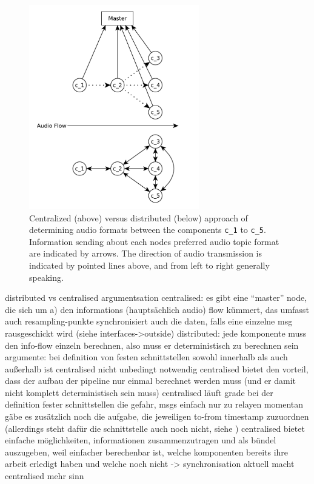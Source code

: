 \begin{figure}[]
	\centering
	\includegraphics[width=0.66\textwidth]{diagrams/lib_central_vs_dist.pdf}
	\caption{Centralized (above) versus distributed (below) approach of determining audio formats between the components \texttt{c\_1} to \texttt{c\_5}.
		Information sending about each nodes preferred audio topic format are indicated by arrows.
		The direction of audio transmission is indicated by pointed lines above, and from left to right generally speaking.}
	\label{pic:main:lib:central_vs_dist}
\end{figure}



distributed vs centralised argumentsation
centralised:
es gibt eine “master” node, die sich um a) den informations (hauptsächlich audio) flow kümmert, das umfasst auch resampling-punkte 
synchronisiert auch die daten, falls eine einzelne msg rausgeschickt wird (siehe interfaces->outside)
distributed:
jede komponente muss den info-flow einzeln berechnen, also muss er deterministisch zu berechnen sein
argumente:
bei definition von festen schnittstellen sowohl innerhalb als auch außerhalb ist centralised nicht unbedingt notwendig
centralised bietet den vorteil, dass der aufbau der pipeline nur einmal berechnet werden muss (und er damit nicht komplett deterministisch sein muss)
centralised läuft grade bei der definition fester schnittstellen die gefahr, msgs einfach nur zu relayen
momentan gäbe es zusätzlich noch die aufgabe, die jeweiligen to-from timestamp zuzuordnen (allerdings steht dafür die schnittstelle auch noch nicht, siehe )
centralised bietet einfache möglichkeiten, informationen zusammenzutragen und als bündel auszugeben, weil einfacher berechenbar ist, welche komponenten bereits ihre arbeit erledigt haben und welche noch nicht -> synchronisation
aktuell macht centralised mehr sinn

